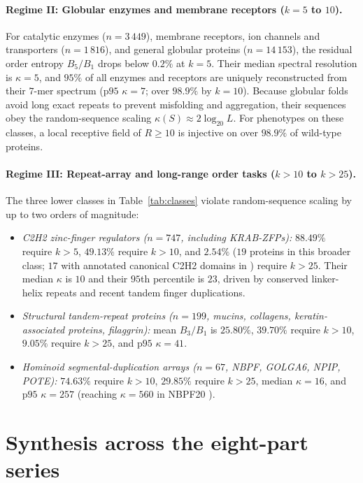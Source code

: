 \documentclass[11pt]{article}
\theoremstyle{plain}
\theoremstyle{definition}
\theoremstyle{remark}
\begin{document}
\paragraph{Regime II: Globular enzymes and membrane receptors ($k=5$ to $10$).}
For catalytic enzymes ($n=3\,449$), membrane receptors, ion channels and transporters ($n=1\,816$), and general
globular proteins ($n=14\,153$), the residual order entropy $B_5/B_1$ drops below $0.2\%$ at $k=5$. Their median
spectral resolution is $\kappa=5$, and $95\%$ of all enzymes and receptors are uniquely reconstructed from their
$7$-mer spectrum ($\text{p95 }\kappa=7$; over $98.9\%$ by $k=10$). Because globular folds avoid long exact repeats to
prevent misfolding and aggregation, their sequences obey the random-sequence scaling $\kappa(S)\approx2\log_{20}L$.
For phenotypes on these classes, a local receptive field of $R\ge10$ is injective on over $98.9\%$ of wild-type
proteins.

\paragraph{Regime III: Repeat-array and long-range order tasks ($k>10$ to $k>25$).}
The three lower classes in Table~\ref{tab:classes} violate random-sequence scaling by up to two orders of magnitude:
\begin{itemize}
\item \emph{C2H2 zinc-finger regulators ($n=747$, including KRAB-ZFPs):} $88.49\%$ require $k>5$, $49.13\%$ require
$k>10$, and $2.54\%$ ($19$ proteins in this broader class; $17$ with annotated canonical C2H2 domains in \cite{CC26f})
require $k>25$. Their median $\kappa$ is $10$ and their $95$th percentile is $23$, driven by conserved linker-helix
repeats and recent tandem finger duplications.
\item \emph{Structural tandem-repeat proteins ($n=199$, mucins, collagens, keratin-associated proteins, filaggrin):}
mean $B_3/B_1$ is $25.80\%$, $39.70\%$ require $k>10$, $9.05\%$ require $k>25$, and $\text{p95 }\kappa=41$.
\item \emph{Hominoid segmental-duplication arrays ($n=67$, NBPF, GOLGA6, NPIP, POTE):} $74.63\%$ require $k>10$,
$29.85\%$ require $k>25$, median $\kappa=16$, and $\text{p95 }\kappa=257$ (reaching $\kappa=560$ in NBPF20
\cite{CC26b}).
\end{itemize}

\section{Synthesis across the eight-part series}\label{sec:synthesis}
\end{document}
